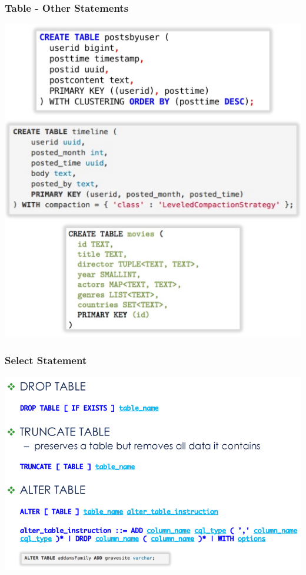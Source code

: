 \documentclass{article}
\begin{document}
\pagebreak

\subsubsection{Table - Other Statements}

\begin{center}
  \includegraphics[scale=0.3]{26}
\end{center}

\subsubsection{Select Statement}

\begin{center}
  \includegraphics[scale=0.3]{27}
\end{center}
\end{document}
